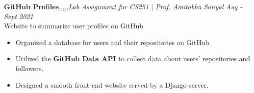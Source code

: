\textbf{GitHub Profiles}\sep\py\sep\django\sep\gh\sep\bs\sep{\it Lab Assignment for CS251 $|$ Prof. Amitabha Sanyal}  \hfill{\sl \small Aug - Sept 2021}\\
\vspace{-8pt}
\emerrow Website to summarize user profiles on GitHub
\begin{itemize}[itemsep = -1.3 mm, leftmargin=*]
\item Organized a database for users and their repositories on GitHub.
\item Utilized the {\bf GitHub Data API} to collect data about users' repositories and followers.
\item Designed a smooth front-end website served by a Django server.
\end{itemize}